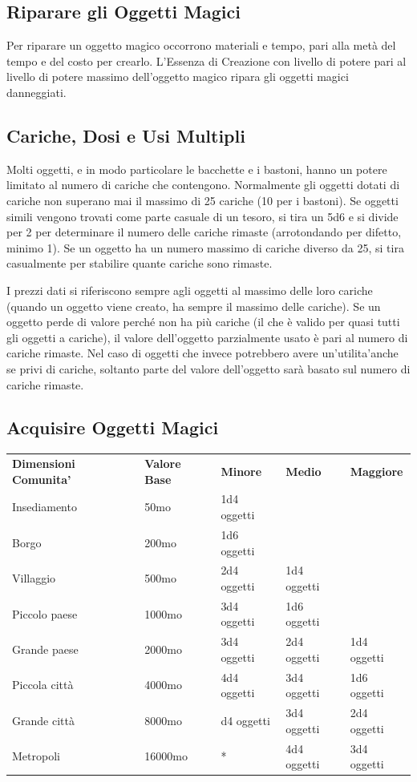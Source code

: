 \documentclass[a4paper,11pt,twoside,openany]{book}
\begin{document}
{\subsection{Riparare gli Oggetti Magici}
\label{riparare-gli-oggetti-magici}

Per riparare un oggetto magico occorrono materiali e tempo, pari alla metà del tempo e del costo per crearlo. L'Essenza di Creazione con livello di potere pari al livello di potere massimo dell'oggetto magico ripara gli oggetti magici danneggiati.


\subsection{Cariche, Dosi e Usi Multipli}

\label{cariche-dosi-e-usi-multipli}

Molti oggetti, e in modo particolare le bacchette e i bastoni, hanno un potere limitato al numero di cariche che contengono. Normalmente gli oggetti dotati di cariche non superano mai il massimo di 25 cariche (10 per i bastoni). Se oggetti simili vengono trovati come parte casuale di un tesoro, si tira un 5d6 e si divide per 2 per determinare il numero delle cariche rimaste (arrotondando per difetto, minimo 1). Se un oggetto ha un numero massimo di cariche diverso da 25, si tira casualmente per stabilire quante cariche sono rimaste.

I prezzi dati si riferiscono sempre agli oggetti al massimo delle loro cariche (quando un oggetto viene creato, ha sempre il massimo delle cariche). Se un oggetto perde di valore perché non ha più cariche (il che è valido per quasi tutti gli oggetti a cariche), il valore dell'oggetto parzialmente usato è pari al numero di cariche rimaste. Nel caso di oggetti che invece potrebbero avere un'utilita'anche se privi di cariche, soltanto parte del valore dell'oggetto sarà basato sul numero di cariche rimaste.


\subsection{Acquisire Oggetti Magici}

\label{acquisire-oggetti-magici}

\bigskip

\begin{tabular}{lllll}
\toprule 
\textbf{Dimensioni Comunita'} & \textbf{Valore Base} & \textbf{Minore} & \textbf{Medio} & \textbf{Maggiore}\tabularnewline
Insediamento & 50mo & 1d4 oggetti & & \tabularnewline
Borgo & 200mo & 1d6 oggetti & & \tabularnewline
Villaggio & 500mo & 2d4 oggetti & 1d4 oggetti & \tabularnewline
Piccolo paese & 1000mo & 3d4 oggetti & 1d6 oggetti & \tabularnewline
Grande paese & 2000mo & 3d4 oggetti & 2d4 oggetti & 1d4 oggetti\tabularnewline
Piccola città & 4000mo & 4d4 oggetti & 3d4 oggetti & 1d6 oggetti\tabularnewline
Grande città & 8000mo & d4 oggetti & 3d4 oggetti & 2d4 oggetti\tabularnewline
Metropoli & 16000mo & {*} & 4d4 oggetti & 3d4 oggetti\tabularnewline
\end{tabular}

}
\end{document}
